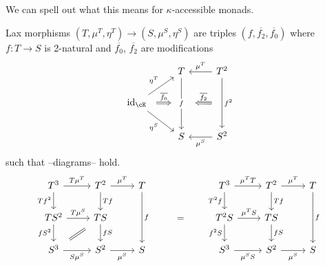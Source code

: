 \documentclass[a4paper,11pt,oneside,openany]{scrbook}
\begin{document}
\begin{exmp}
    We can spell out what this means for $\kappa$-accessible monads.

    Lax morphisms $(T,\mu^T,\eta^T)\rightarrow(S,\mu^S,\eta^S)$ are triples
    $(f,\overline{f_2},\overline{f_0})$ where $f\colon T\rightarrow S$ is
    2-natural and $\overline{f_0}$, $\overline{f_2}$ are modifications
    \[\begin{tikzcd}
        & T & {T^2} \\
        {\id_{\cK}} & {} \\
        & S & {S^2}
        \arrow["{\eta^T}", from=2-1, to=1-2]
        \arrow["{\eta^S}"', from=2-1, to=3-2]
        \arrow["{\mu^S}", from=3-3, to=3-2]
        \arrow["{\mu^T}"', from=1-3, to=1-2]
        \arrow[""{name=0, anchor=center, inner sep=0}, "{f^2}", from=1-3, to=3-3]
        \arrow["f"{description}, from=1-2, to=3-2]
        \arrow["{\overline{f_0}}", shorten <=6pt, shorten >=6pt, Rightarrow, from=2-1, to=2-2]
        \arrow["{\overline{f_2}}"', shorten <=10pt, shorten >=10pt, Rightarrow, from=0, to=2-2]
    \end{tikzcd}\]
    such that --diagrams-- hold.
    \[\begin{tikzcd}
        {T^3} & {T^2} & T && {T^3} & {T^2} & T \\
        {TS^2} & TS && {=} & {T^2S} & TS \\
        {S^3} & {S^2} & S && {S^3} & {S^2} & S
        \arrow[""{name=0, anchor=center, inner sep=0}, "f", from=1-3, to=3-3]
        \arrow["{\mu^S}"', from=3-2, to=3-3]
        \arrow["{S\mu^S}"', from=3-1, to=3-2]
        \arrow["{T\mu^S}", from=2-1, to=2-2]
        \arrow["{T\mu^T}", from=1-1, to=1-2]
        \arrow[""{name=1, anchor=center, inner sep=0}, "Tf", from=1-2, to=2-2]
        \arrow["{\mu^T}", from=1-2, to=1-3]
        \arrow["{f S^2}"', from=2-1, to=3-1]
        \arrow[""{name=2, anchor=center, inner sep=0}, "{Tf^2}"', from=1-1, to=2-1]
        \arrow["fS", from=2-2, to=3-2]
        \arrow[shorten <=8pt, shorten >=8pt, Rightarrow, no head, from=3-1, to=2-2]
        \arrow[""{name=3, anchor=center, inner sep=0}, "f", from=1-7, to=3-7]
        \arrow["{\mu^S}"', from=3-6, to=3-7]
        \arrow["{\mu^SS}"', from=3-5, to=3-6]
        \arrow["{\mu^TS}", from=2-5, to=2-6]
        \arrow["{\mu^TT}", from=1-5, to=1-6]
        \arrow["{\mu^T}", from=1-6, to=1-7]
        \arrow["Tf", from=1-6, to=2-6]
        \arrow[""{name=4, anchor=center, inner sep=0}, "fS", from=2-6, to=3-6]
        \arrow[""{name=5, anchor=center, inner sep=0}, "{f^2S}"', from=2-5, to=3-5]
        \arrow["{T^2f}"', from=1-5, to=2-5]

\end{tikzcd}\]
\end{exmp}
\end{document}

